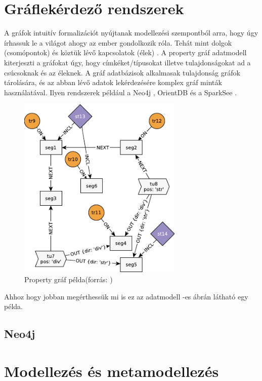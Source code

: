 \section{Gráflekérdező rendszerek}
A gráfok intuitív formalizációt nyújtanak modellezési szempontból arra, hogy úgy írhassuk le a világot ahogy az ember gondolkozik róla. Tehát mint dolgok (csomópontok) és köztük lévő kapcsolatok (élek) \cite{marton2017model}. A property gráf adatmodell kiterjeszti a gráfokat úgy, hogy címkéket/típusokat illetve tulajdonságokat ad a csúcsoknak és az éleknek. A gráf adatbázisok  alkalmasak tulajdonság gráfok tárolására, és az abban lévő adatok lekérdezésére komplex gráf minták használatával. Ilyen rendszerek például a    Neo4j \cite{neo4j}, OrientDB \cite{orientdb} és a  SparkSee \cite{sparksee}.

\begin{figure}
	\centering
	\includegraphics[width=0.7\textwidth]{figures/tulajdonsággráfpélda}
	\caption{Property gráf példa(forrás: \cite{marton2017model})}
	\label{fig:tulajdonsággráfpélda}
\end{figure}

Ahhoz hogy jobban megérthessük mi is ez az adatmodell  -es ábrán látható egy példa.
\subsection{Neo4j}




\section{Modellezés és metamodellezés}

